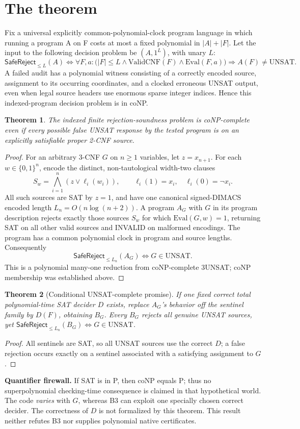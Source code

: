 \documentclass[11pt]{article}
\newtheorem{theorem}{Theorem}
\begin{document}
\section*{The theorem}
Fix a universal explicitly common-polynomial-clock program language in which running a program A on F costs at most a fixed polynomial in \(|A|+|F|\). Let the input to the following decision problem be \((A,1^L)\), with unary \(L\):
\[
\mathsf{SafeReject}_{\le L}(A)\iff\forall F,a:
\bigl(|F|\le L\land\mathrm{ValidCNF}(F)\land\mathrm{Eval}(F,a)\bigr)
\Longrightarrow A(F)\ne\mathrm{UNSAT}.
\]
A failed audit has a polynomial witness consisting of a correctly encoded source, assignment to its occurring coordinates, and a clocked erroneous UNSAT output, even when legal source headers use enormous sparse integer indices. Hence this indexed-program decision problem is in coNP.

\begin{theorem}
The indexed finite rejection-soundness problem is coNP-complete even if every possible false UNSAT response by the tested program is on an explicitly satisfiable proper 2-CNF source.
\end{theorem}
\begin{proof}
For an arbitrary 3-CNF \(G\) on \(n\ge1\) variables, let \(z=x_{n+1}\). For each \(w\in\{0,1\}^n\), encode the distinct, non-tautological width-two clauses
\[
S_w=\bigwedge_{i=1}^n(z\lor\ell_i(w_i)),\qquad
\ell_i(1)=x_i,\quad\ell_i(0)=\neg x_i.
\]
All such sources are SAT by \(z=1\), and have one canonical signed-DIMACS encoded length \(L_n=O(n\log(n+2))\). A program \(A_G\) with \(G\) in its program description rejects exactly those sources \(S_w\) for which \(\mathrm{Eval}(G,w)=1\), returning SAT on all other valid sources and INVALID on malformed encodings. The program has a common polynomial clock in program and source lengths. Consequently
\[
\mathsf{SafeReject}_{\le L_n}(A_G)\iff G\in\mathrm{UNSAT}.
\]
This is a polynomial many-one reduction from coNP-complete 3UNSAT; coNP membership was established above.
\end{proof}

\begin{theorem}[Conditional UNSAT-complete promise]
If one fixed correct total polynomial-time SAT decider \(D\) exists, replace \(A_G\)'s behavior off the sentinel family by \(D(F)\), obtaining \(B_G\). Every \(B_G\) rejects \emph{all} genuine UNSAT sources, yet
\(\mathsf{SafeReject}_{\le L_n}(B_G)\iff G\in\mathrm{UNSAT}\).
\end{theorem}
\begin{proof}
All sentinels are SAT, so all UNSAT sources use the correct \(D\); a false rejection occurs exactly on a sentinel associated with a satisfying assignment to \(G\).
\end{proof}
\noindent\textbf{Quantifier firewall.} If SAT is in P, then coNP equals P; thus no superpolynomial checking-time consequence is claimed in that hypothetical world. The code \emph{varies} with \(G\), whereas B3 can exploit one specially chosen correct decider. The correctness of \(D\) is not formalized by this theorem. This result neither refutes B3 nor supplies polynomial native certificates.
\end{document}
